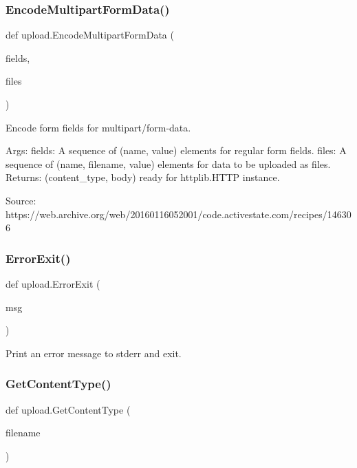 \subsubsection{\texorpdfstring{EncodeMultipartFormData()}{EncodeMultipartFormData()}}
{\footnotesize\ttfamily def upload.\+Encode\+Multipart\+Form\+Data (\begin{DoxyParamCaption}\item[{}]{fields,  }\item[{}]{files }\end{DoxyParamCaption})}

\begin{DoxyVerb}Encode form fields for multipart/form-data.

Args:
  fields: A sequence of (name, value) elements for regular form fields.
  files: A sequence of (name, filename, value) elements for data to be
         uploaded as files.
Returns:
  (content_type, body) ready for httplib.HTTP instance.

Source:
  https://web.archive.org/web/20160116052001/code.activestate.com/recipes/146306
\end{DoxyVerb}
 \mbox{\label{namespaceupload_adea53186a1d73e92cc839b7c35c2c044}} 
\subsubsection{\texorpdfstring{ErrorExit()}{ErrorExit()}}
{\footnotesize\ttfamily def upload.\+Error\+Exit (\begin{DoxyParamCaption}\item[{}]{msg }\end{DoxyParamCaption})}

\begin{DoxyVerb}Print an error message to stderr and exit.\end{DoxyVerb}
 \mbox{\label{namespaceupload_a753a004706d964335ad218628e07b063}} 
\subsubsection{\texorpdfstring{GetContentType()}{GetContentType()}}
{\footnotesize\ttfamily def upload.\+Get\+Content\+Type (\begin{DoxyParamCaption}\item[{}]{filename }\end{DoxyParamCaption})}

